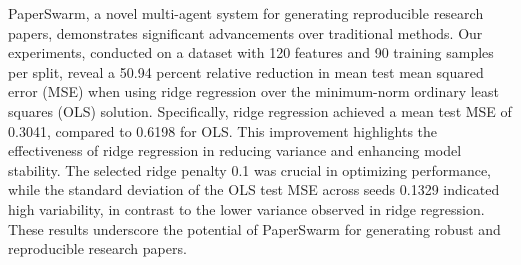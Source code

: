 PaperSwarm, a novel multi-agent system for generating reproducible research papers, demonstrates significant advancements over traditional methods. Our experiments, conducted on a dataset with 120 features and 90 training samples per split, reveal a 50.94 percent relative reduction in mean test mean squared error (MSE) when using ridge regression over the minimum-norm ordinary least squares (OLS) solution. Specifically, ridge regression achieved a mean test MSE of 0.3041, compared to 0.6198 for OLS. This improvement highlights the effectiveness of ridge regression in reducing variance and enhancing model stability. The selected ridge penalty 0.1 was crucial in optimizing performance, while the standard deviation of the OLS test MSE across seeds 0.1329 indicated high variability, in contrast to the lower variance observed in ridge regression. These results underscore the potential of PaperSwarm for generating robust and reproducible research papers.
